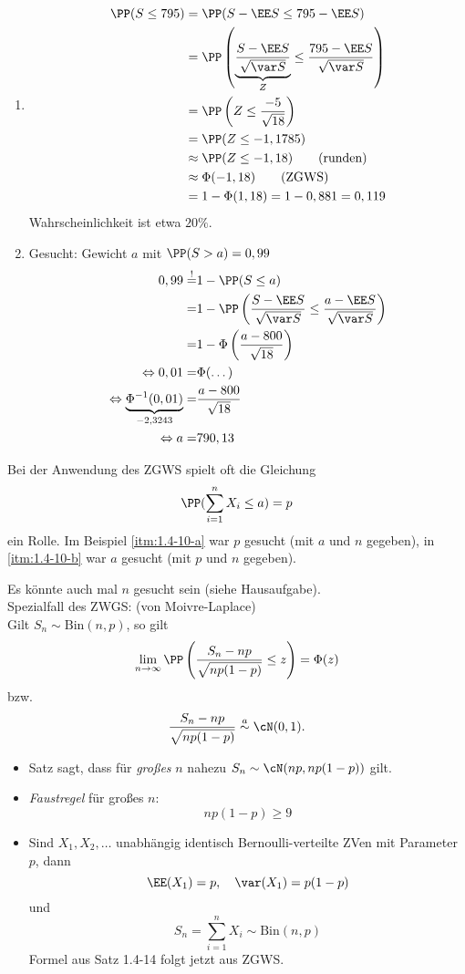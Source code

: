 \documentclass{scrreprt}
\renewenvironment{anumerate}{\begin{enumerate}[label=(\alph*)]}{\end{enumerate}} %
\begin{document}
\begin{anumerate}
\item
\begin{align*}
\PP(S \leq 795) &= \PP( S - \EE S \leq 795 - \EE S) \\
&= \PP\left(\underbrace{\frac{S - \EE S}{\sqrt{\var S}}}_{Z}\leq \frac{795-\EE S}{\sqrt{ \var S}}\right)\\
&= \PP\left( Z \leq \frac{-5}{\sqrt{18}}\right)\\
&= \PP(Z \leq - 1,1785)\\
&\approx \PP(Z \leq - 1,18) \qquad \text{(runden)}\\
&\approx \Phi(-1,18) \qquad \text{(ZGWS)}\\
&= 1- \Phi(1,18) = 1-0,881 = 0,119
\end{align*}
Wahrscheinlichkeit ist etwa $20\%$.
\item Gesucht: Gewicht $a$ mit $\PP(S > a) = 0,99$
\begin{align*}
0,99 \overset{!}{=}& 1- \PP(S \leq a)\\
=& 1- \PP\left( \frac{S-\EE S}{\sqrt{\var S}} \leq \frac{a-\EE S}{\sqrt{\var S}}\right)\\
=& 1- \Phi\left(\frac{a-800}{\sqrt{18}}\right)\\
\Leftrightarrow 0,01 =& \Phi (\dots)\\
\Leftrightarrow \underbrace{\Phi^{-1} (0,01)}_{-2,3243} =& \frac{a-800}{\sqrt{18}}\\
\Leftrightarrow a =& 790,13
\end{align*}
\end{anumerate}

Bei der Anwendung des ZGWS spielt oft die Gleichung
$$\PP(\sum_{i=1}^n X_i \leq a) = p$$
ein Rolle. Im Beispiel \ref{itm:1.4-10-a} war $p$ gesucht (mit $a$ und $n$ gegeben), in \ref{itm:1.4-10-b} war $a$ gesucht (mit $p$ und $n$ gegeben). 

Es könnte auch mal $n$ gesucht sein (siehe Hausaufgabe).\\
Spezialfall des ZWGS:
 (von Moivre-Laplace)\\
Gilt $S_n \sim \mathrm{Bin}(n,p)$, so gilt 
$$\lim_{n\to \infty} \PP\left( \frac{S_n - np}{\sqrt{np (1-p)}} \leq z \right) = \Phi(z)$$
bzw.
$$\frac{S_n - np}{\sqrt{np (1-p)}} \overset{a}{\sim} \cN(0,1)\text{.}$$

\begin{itemize}
\item Satz sagt, dass für \emph{großes} $n$ nahezu $S_n \sim \cN(np, np(1-p))$ gilt.
\item \emph{Faustregel} für großes $n$:
$$np(1-p) \geq 9$$
\item Sind $X_1, X_2, \ldots$ unabhängig identisch Bernoulli-verteilte ZVen mit Parameter $p$, dann
$$\EE(X_1)=p, \quad \var (X_1) = p (1-p)$$
und
$$S_n = \sum_{i=1}^n X_i \sim \mathrm{Bin}(n,p)$$
Formel aus Satz 1.4-14 folgt jetzt aus ZGWS.
\end{itemize}
\end{document}
